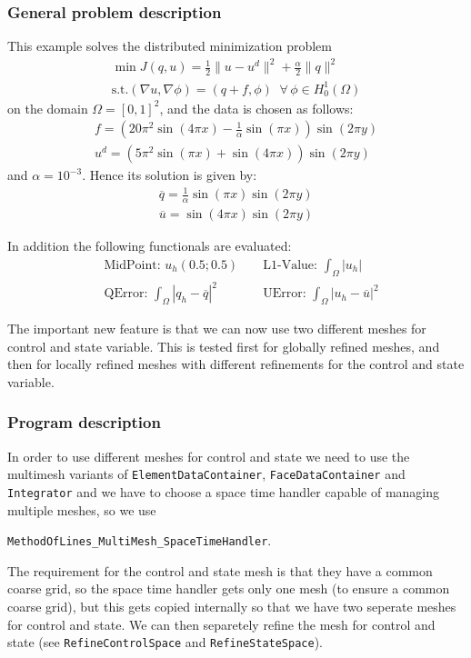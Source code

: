 \subsubsection{General problem description}
This example solves the distributed minimization problem
\begin{gather*}
\min J(q,u) = \frac{1}{2} \|u-u^d\|^2 + \frac{\alpha}{2}\|q\|^2\\
\text{s.t.} (\nabla u,\nabla \phi) = (q+f,\phi)\;\;\forall\,\phi \in H^1_0(\Omega)
\end{gather*}
on the domain $\Omega = [0,1]^2$, and the data is chosen as follows:
\begin{gather*}
 f = \left(20\pi^2  \sin(4 \pi x) - \frac{1}{\alpha}  \sin(\pi x)\right) \sin(2 \pi y)\\
 u^d = \left( 5 \pi^2 \sin(\pi x) + \sin(4 \pi x)\right)  \sin(2\pi y)
\end{gather*}
and $\alpha = 10^{-3}$.
Hence its solution is given by:
\begin{gather*}
 \overline{q} = \frac{1}{\alpha} \sin(\pi x) \sin(2 \pi y)\\
 \overline{u} = \sin(4 \pi x) \sin(2 \pi y)
\end{gather*}

In addition the following functionals are evaluated:
\begin{align*}
  &\text{MidPoint: } u_h(0.5 ; 0.5)&&
  \text{ L1-Value: }\int_\Omega |u_h|\\
  &\text{QError: }\int_\Omega |q_h-\overline{q}|^2
  &&\text{  UError: }\int_\Omega |u_h-\overline{u}|^2
\end{align*}
 
The important new feature is that we can now use two different meshes for control and state variable.
This is tested first for globally refined meshes, and then for locally refined meshes with different refinements for the control and state variable.
\subsubsection{Program description}
In order to use different meshes for control and state we need to use the multimesh variants of \texttt{ElementDataContainer}, \texttt{FaceDataContainer} and \texttt{Integrator} and we have to choose a space time handler capable of managing multiple meshes, so we use 

\texttt{MethodOfLines\_MultiMesh\_SpaceTimeHandler}.

The requirement for the control and state mesh is that they have a common coarse grid, so the space time handler gets only one mesh (to ensure a common coarse grid), but this gets copied internally so that we have two seperate meshes for control and state. We can then separetely refine the mesh for control and state (see \texttt{RefineControlSpace} and  \texttt{RefineStateSpace}).


